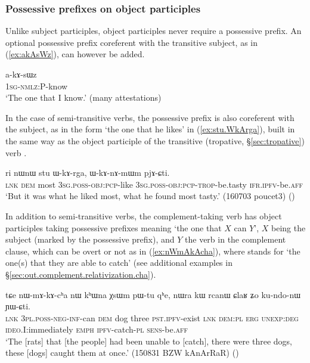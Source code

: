 \subsubsection{Possessive prefixes on object participles}  \label{sec:object.participle.possessive} 
Unlike subject participles, object participles never require a possessive prefix. An optional possessive prefix coreferent with the transitive subject, as in (\ref{ex:akAsWz}), can however be added.
  
  \begin{exe}
\ex \label{ex:akAsWz}
\gll a-kɤ-sɯz    \\
   \textsc{1sg}-\textsc{nmlz}:P-know \\
 \glt  `The one that I know.' (many attestations)
 \end{exe}

In the case of semi-transitive verbs, the possessive prefix is also coreferent with the subject, as in the form  `the one that he likes' in (\ref{ex:stu.WkArga}), built in the same way as the object participle of the transitive (tropative, §\ref{sec:tropative}) verb .

\begin{exe}
\ex \label{ex:stu.WkArga}
\gll ri nɯnɯ stu ɯ-kɤ-rga, ɯ-kɤ-nɤ-mɯm pjɤ-ɕti. \\
\textsc{lnk} \textsc{dem}  most \textsc{3sg}.\textsc{poss}-\textsc{obj}:\textsc{pcp}-like \textsc{3sg}.\textsc{poss}-\textsc{obj}:\textsc{pcp}-\textsc{trop}-be.tasty \textsc{ifr}.\textsc{ipfv}-be.\textsc{aff} \\
\glt `But it was what he liked most, what he found most tasty.' (160703 poucet3) ()
\end{exe}

In addition to semi-transitive verbs, the complement-taking verb  has object participles taking possessive prefixes meaning `the one that $X$ can $Y$', $X$ being the subject (marked by the possessive prefix), and $Y$ the verb in the complement clause, which can be overt or not as in (\ref{ex:nWmAkAcha}), where  stands for  `the one(s) that they are able to catch' (see additional examples in §\ref{sec:out.complement.relativization.cha}).
 
\begin{exe}
\ex  \label{ex:nWmAkAcha}
\gll tɕe nɯ-mɤ-kɤ-cʰa nɯ kʰɯna χsɯm pɯ-tu qʰe, nɯra kɯ rcanɯ ɕlaʁ ʑo ku-ndo-nɯ ɲɯ-ɕti. \\
\textsc{lnk} \textsc{3pl}.\textsc{poss}-\textsc{neg}-\textsc{inf}-can \textsc{dem} dog three \textsc{pst}.\textsc{ipfv}-exist \textsc{lnk} \textsc{dem}:\textsc{pl} \textsc{erg} \textsc{unexp}:\textsc{deg} \textsc{ideo}.I:immediately \textsc{emph} \textsc{ipfv}-catch-\textsc{pl} \textsc{sens}-be.\textsc{aff} \\
\glt `The [rats] that [the people] had been unable to [catch], there were three dogs, these [dogs] caught them at once.' (150831 BZW kAnArRaR)
()
\end{exe}


